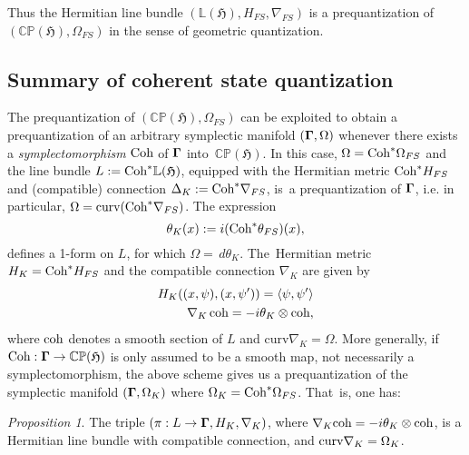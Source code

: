 \documentclass[11pt]{amsart}
\numberwithin{equation}{section}
\theoremstyle{remark}
\newcommand\HH{\mathfrak H}
\newtheorem{prop}[defi]{Proposition}
\newcommand{\prhs}{{\mathbb C\mathbb P}( \HH)}
\newcommand{\bigam}{\mbox{\boldmath $\Gamma$}}
\begin{document}
Thus  the Hermitian line bundle $(\mathbb L(\HH), H_{FS}, \nabla_{FS})$ is a
prequantization  of $(\prhs, \Omega_{FS})$ in the sense of geometric
quantization.


\subsection{Summary of coherent state quantization}\label{sec-summcohstquant}

The prequantization of $(\prhs,\Omega_{FS})$ can be exploited to obtain a
prequantization of an arbitrary symplectic manifold $(\bigam ,\Omega)$ whenever
there exists a  {\em symplectomorphism} $\mbox{\rm Coh}$ of $\bigam$
into~$\prhs$. In this case, $\Omega = \mbox{\rm Coh}^* \Omega_{FS}$ and the
line bundle $L:= \mbox{\rm Coh}^*\mathbb L(\HH)$, equipped with the
Hermitian metric $\mbox{\rm Coh}^*H_{FS}$ and (compatible) connection
$\Delta_K:= \mbox{\rm Coh}^*\nabla_{FS}$, is~a prequantization of $\bigam$,
i.e. in particular, $\Omega = \mbox{curv}
(\mbox{\rm Coh}^*\nabla_{FS})$. The expression
\begin{equation}  \theta_K(x):= i(\mbox{\rm Coh}^{*}\theta_{FS})(x),
\end{equation}
defines a 1-form on $L$, for which $\Omega = \,d \theta_K$.
The~Hermitian metric $H_K = \mbox{\rm Coh}^* H_{FS}$ and the compatible
connection $\nabla_K$ are given by
\begin{eqnarray}
H_K((x,\psi),(x,\psi^\prime) ) = \langle \psi, \psi^\prime \rangle\\
\nabla_K\,\mbox{\rm coh} = -i\theta_K \otimes \mbox{\rm coh},
\end{eqnarray}
where $\mbox{\rm coh}$ denotes a smooth section of $L$ and $\mbox{curv}
\nabla_K = \Omega$. More generally, if $\mbox{\rm Coh}: \bigam \to \prhs$ is
only assumed to be a smooth map, not necessarily a symplectomorphism, the above
scheme gives us a prequantization of the symplectic manifold
$(\bigam,\Omega_K)$  where $\Omega_K = \mbox{\rm Coh}^*\Omega_{FS}$. That~is,
one has:

\begin{prop} \label{bundle}
The triple $ (\pi: L  \to  \bigam, H_K, \nabla _K) $,
where $\nabla _K\mbox{\rm coh}  = -i\theta_K\otimes \mbox{\rm coh}$,  is a
Hermitian line bundle with compatible connection, and $\mbox{\rm curv}
\nabla_{K} = \Omega_{K} $.  \end{prop}
\end{document}
